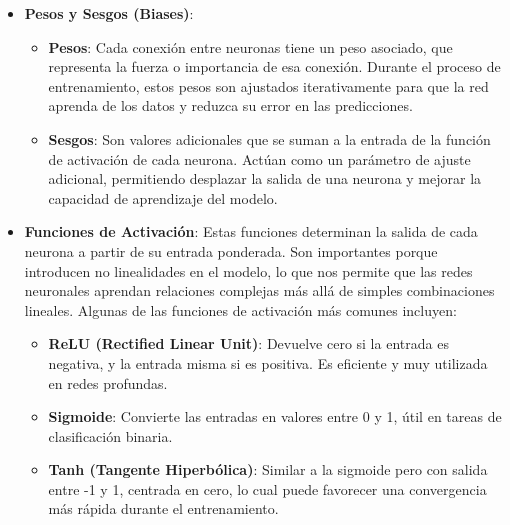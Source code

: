 \documentclass[11pt]{article} %
\begin{document}
\begin{itemize}
   \item\textbf{Pesos y Sesgos (Biases)}:
    \begin{itemize}
        \item \textbf{Pesos}: Cada conexión entre neuronas tiene un peso asociado, que representa la fuerza o importancia de esa conexión. Durante el proceso de entrenamiento, estos pesos son ajustados iterativamente para que la red aprenda de los datos y reduzca su error en las predicciones.
        \item \textbf{Sesgos}: Son valores adicionales que se suman a la entrada de la función de activación de cada neurona. Actúan como un parámetro de ajuste adicional, permitiendo desplazar la salida de una neurona y mejorar la capacidad de aprendizaje del modelo.
    \end{itemize}
    \item \textbf{Funciones de Activación}: Estas funciones determinan la salida de cada neurona a partir de su entrada ponderada. Son importantes porque introducen no linealidades en el modelo, lo que nos permite que las redes neuronales aprendan relaciones complejas más allá de simples combinaciones lineales. Algunas de las funciones de activación más comunes incluyen:
    \begin{itemize}
        \item \textbf{ReLU (Rectified Linear Unit)}: Devuelve cero si la entrada es negativa, y la entrada misma si es positiva. Es eficiente y muy utilizada en redes profundas.
        \item \textbf{Sigmoide}: Convierte las entradas en valores entre 0 y 1, útil en tareas de clasificación binaria. 
        \item \textbf{Tanh (Tangente Hiperbólica)}: Similar a la sigmoide pero con salida entre -1 y 1, centrada en cero, lo cual puede favorecer una convergencia más rápida durante el entrenamiento.
    \end{itemize}
\end{itemize}
\end{document}
